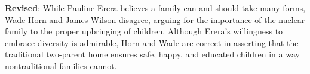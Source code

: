 \textbf{Revised}: While Pauline Erera believes a family can and should take many forms, Wade Horn and James Wilson disagree, arguing for the importance of the nuclear family to the proper upbringing of children. Although Erera's willingness to embrace diversity is admirable, Horn and Wade are correct in asserting that the traditional two-parent home ensures safe, happy, and educated children in a way nontraditional families cannot.

